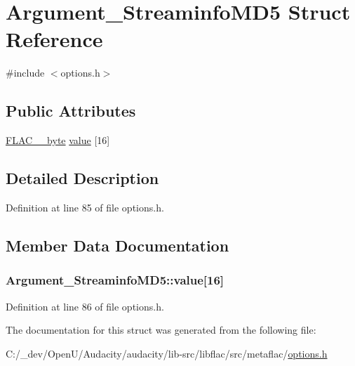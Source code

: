 \hypertarget{struct_argument___streaminfo_m_d5}{}\section{Argument\+\_\+\+Streaminfo\+M\+D5 Struct Reference}
\label{struct_argument___streaminfo_m_d5}


{\ttfamily \#include $<$options.\+h$>$}

\subsection*{Public Attributes}
\begin{DoxyCompactItemize}
\item 
\hyperlink{ordinals_8h_a5eb569b12d5b047cdacada4d57924ee3}{F\+L\+A\+C\+\_\+\+\_\+byte} \hyperlink{struct_argument___streaminfo_m_d5_a51eb641f07c54ac64aadde13646a53a6}{value} \mbox{[}16\mbox{]}
\end{DoxyCompactItemize}


\subsection{Detailed Description}


Definition at line 85 of file options.\+h.



\subsection{Member Data Documentation}
\subsubsection[{\texorpdfstring{value}{value}}]{ Argument\+\_\+\+Streaminfo\+M\+D5\+::value\mbox{[}16\mbox{]}}\hypertarget{struct_argument___streaminfo_m_d5_a51eb641f07c54ac64aadde13646a53a6}{}\label{struct_argument___streaminfo_m_d5_a51eb641f07c54ac64aadde13646a53a6}


Definition at line 86 of file options.\+h.



The documentation for this struct was generated from the following file\+:\begin{DoxyCompactItemize}
\item 
C\+:/\+\_\+dev/\+Open\+U/\+Audacity/audacity/lib-\/src/libflac/src/metaflac/\hyperlink{libflac_2src_2metaflac_2options_8h}{options.\+h}\end{DoxyCompactItemize}
